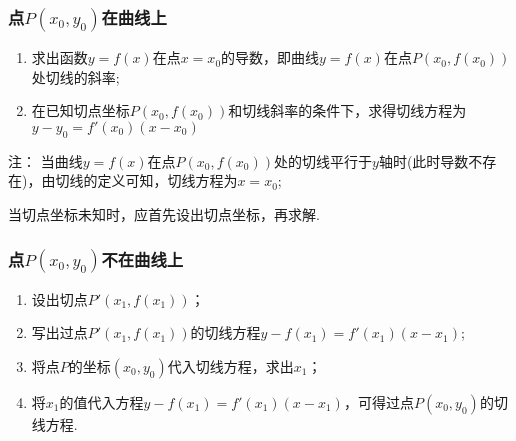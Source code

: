     \subsubsection{点$ P(x_0,y_0) $在曲线上}
      {\kaishu \begin{enumerate}[(1)]
      \item 求出函数$y= f(x) $在点$ x=x_0 $的导数，即曲线$y=f(x)$在点$ P(x_0,f(x_0)) $处切线的斜率;
      \item 在已知切点坐标$ P(x_0,f(x_0)) $和切线斜率的条件下，求得切线方程为$ y-y_0=f'(x_0)(x-x_0) $
      \end{enumerate}
      注： 当曲线$y=f(x)$在点$ P(x_0,f(x_0)) $处的切线平行于$y$轴时(此时导数不存在)，由切线的定义可知，切线方程为$ x=x_0 $;\par
       当切点坐标未知时，应首先设出切点坐标，再求解.}
    \subsubsection{点$ P(x_0,y_0) $不在曲线上}
      {\kaishu \begin{enumerate}[1)]
      \item 设出切点$P'\left(x_1,f\left(x_1\right)\right)$；
      \item 写出过点$P'\left(x_1,f\left(x_1\right)\right)$的切线方程$ y-f\left(x_1\right)=f'\left(x_1\right)(x-x_1) $;
      \item 将点$ P $的坐标$ \left(x_0,y_0\right) $代入切线方程，求出$ x_1 $；
      \item 将$ x_1 $的值代入方程$y-f\left(x_1\right)=f'\left(x_1\right)(x-x_1) $，可得过点$ P(x_0,y_0) $的切线方程.
      \end{enumerate}}
